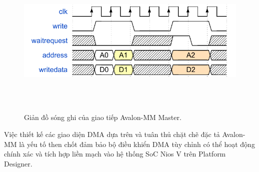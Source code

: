 \begin{enumerate}
    \begin{figure}[htbp]
        \centering
        \includegraphics[width=\linewidth]{Images/02_06_AvalonMaster_WriteWaveform.pdf}
        \caption{Giản đồ sóng ghi của giao tiếp Avalon-MM Master.}
        \label{fig:02_06_avalon_master_write}
    \end{figure}
\end{enumerate}
Việc thiết kế các giao diện DMA dựa trên và tuân thủ chặt chẽ đặc tả Avalon-MM là yếu tố then chốt đảm bảo bộ điều khiển DMA tùy chỉnh có thể hoạt động chính xác và tích hợp liền mạch vào hệ thống SoC Nios V trên Platform Designer.

